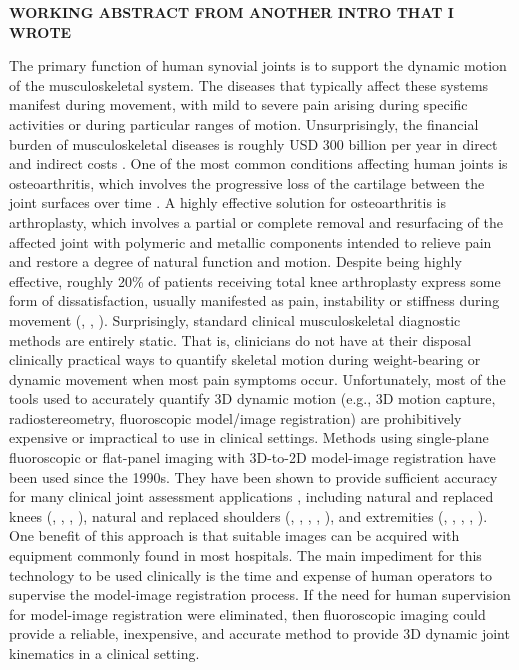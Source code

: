 {\bf \color{blue} WORKING ABSTRACT FROM ANOTHER INTRO THAT I WROTE}

The primary function of human synovial joints is to support the dynamic motion of the musculoskeletal system. The diseases that typically affect these systems manifest during movement, with mild to severe pain arising during specific activities or during particular ranges of motion. Unsurprisingly, the financial burden of musculoskeletal diseases is roughly USD 300 billion per year in direct and indirect costs \cite{BMUSBurdenMusculoskeletal}. One of the most common conditions affecting human joints is osteoarthritis, which involves the progressive loss of the cartilage between the joint surfaces over time \cite{sharmaOsteoarthritisCompanionRheumatology2007}. A highly effective solution for osteoarthritis is arthroplasty, which involves a partial or complete removal and resurfacing of the affected joint with polymeric and metallic components intended to relieve pain and restore a degree of natural function and motion. Despite being highly effective, roughly 20\% of patients receiving total knee arthroplasty express some form of dissatisfaction, usually manifested as pain, instability or stiffness during movement (\cite{bakerRolePainFunction2007}, \cite{scottPredictingDissatisfactionFollowing2010}, \cite{bournePatientSatisfactionTotal2010}). Surprisingly, standard clinical musculoskeletal diagnostic methods are entirely static. That is, clinicians do not have at their disposal clinically practical ways to quantify skeletal motion during weight-bearing or dynamic movement when most pain symptoms occur. Unfortunately, most of the tools used to accurately quantify 3D dynamic motion (e.g., 3D motion capture, radiostereometry, fluoroscopic model/image registration) are prohibitively expensive or impractical to use in clinical settings. Methods using single-plane fluoroscopic or flat-panel imaging with 3D-to-2D model-image registration have been used since the 1990s. They have been shown to provide sufficient accuracy for many clinical  joint assessment applications , including natural and replaced knees (\cite{banksAccurateMeasurementThreedimensional1996}, \cite{banksVivoKinematicsCruciateretaining1997}, \cite{mahfouzRobustMethodRegistration2003}, \cite{zuffiModelbasedMethodReconstruction1999}), natural and replaced shoulders (\cite{matsukiVivo3DAnalysis2014}, \cite{matsukiDynamicVivoGlenohumeral2012}, \cite{zhuAccuracyRepeatabilityAutomatic2012}, \cite{matsukiVivo3dimensionalAnalysis2011}, \cite{kijimaVivo3dimensionalAnalysis2015}), and extremities (\cite{yamaguchiAnkleSubtalarKinematics2009}, \cite{listThreeDimensionalKinematicsUnconstrained2012}, \cite{cenniKinematicsThreeComponents2012}, \cite{cenniFunctionalPerformanceTotal2013}, \cite{tersi3DElbowKinematics2009}). One benefit of this approach is that suitable images can be acquired with equipment commonly found in most hospitals. The main impediment for this technology to be used clinically is the time and expense of human operators to supervise the model-image registration process. If the need for human supervision for model-image registration were eliminated, then fluoroscopic imaging could provide a reliable, inexpensive, and accurate method to provide 3D dynamic joint kinematics in a clinical setting.
